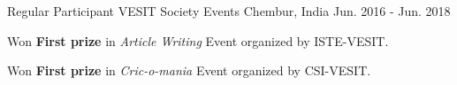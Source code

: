 

\begin{cventries}

  \cventry
    {Regular Participant} %
    {VESIT Society Events} %
    {Chembur, India} %
    {Jun. 2016 - Jun. 2018} %
    {
      \begin{cvitems} %
        \item {Won \textbf{First prize} in \textit{Article Writing} Event organized by ISTE-VESIT.}
        \item {Won\textbf{ First prize} in \textit{Cric-o-mania} Event organized by CSI-VESIT.}
      \end{cvitems}
    }


\end{cventries}
